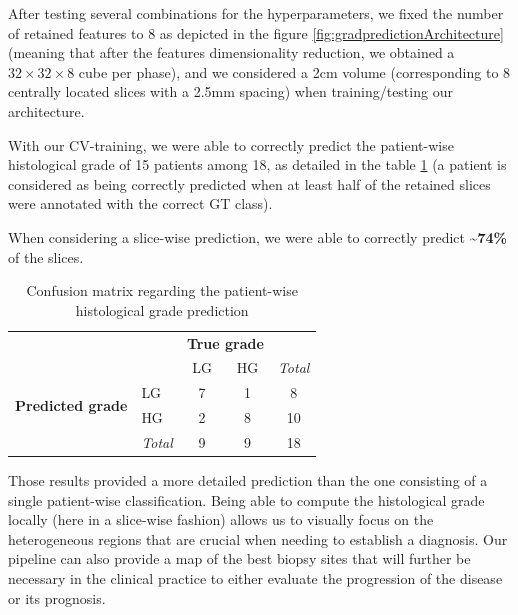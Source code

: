 \documentclass[]{article}
\renewcommand{\arraystretch}{5}
\begin{document}
After testing several combinations for the hyperparameters, we
fixed the number of retained features to 8 as depicted in the
figure \ref{fig:gradpredictionArchitecture} (meaning that after the features dimensionality reduction,
we obtained a $ 32\times32\times8 $ cube per phase), and we considered a 2cm volume
(corresponding to 8 centrally located slices with a 2.5mm spacing) when
training/testing our architecture.

With our CV-training, we were able to correctly predict the patient-wise
histological grade of 15 patients among 18, as detailed in the table \ref{tab:confusion_matrix} (a patient is considered as being correctly predicted
when at least half of the retained slices were annotated with the
correct GT class).

When considering a slice-wise prediction, we were able to correctly
predict \textbf{\textasciitilde{}74\%} of the slices.


\renewcommand{\arraystretch}{2}
\begin{table}[!htp]\centering
\caption{Confusion matrix regarding the patient-wise  histological grade prediction}\label{tab:confusion_matrix}
\begin{tabular}{l|l|c|c|c}
\multicolumn{2}{c}{}&\multicolumn{2}{c}{\textbf{True grade}}&\\
\cline{3-4}
\multicolumn{2}{c|}{}&LG&HG&\multicolumn{1}{c}{\textit{Total}}\\
\cline{2-4}
\multirow{2}{*}{\textbf{Predicted grade}}& LG & 7 & 1 & 8\\
\cline{2-4}
& HG & 2 & 8 & 10 \\
\cline{2-4}
\multicolumn{1}{c}{} & \multicolumn{1}{c}{\textit{Total}} & \multicolumn{1}{c}{9} & \multicolumn{    1}{c}{9} & \multicolumn{1}{c}{18}\\
\end{tabular}
\end{table}
\renewcommand{\arraystretch}{5}


Those results provided a more detailed prediction than the one
consisting of a single patient-wise classification. Being able to
compute the histological grade locally (here in a slice-wise fashion)
allows us to visually focus on the heterogeneous regions that are
crucial when needing to establish a diagnosis. Our pipeline can also
provide a map of the best biopsy sites that will further be necessary in
the clinical practice to either evaluate the progression of the disease
or its prognosis.


\newpage


\end{document}
